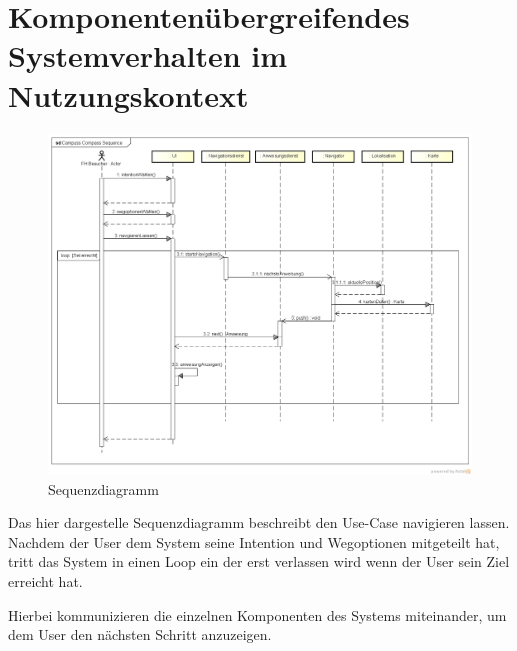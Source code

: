 \chapter{Komponentenübergreifendes Systemverhalten im Nutzungskontext}

\begin{figure}[hbt]
  \centering
   \includegraphics[width=\linewidth]{img/sequenzdiagramm.png}
  \caption{Sequenzdiagramm}
\label{fig:sequenzdiagramm}
\end{figure}

Das hier dargestelle Sequenzdiagramm beschreibt den Use-Case navigieren lassen.
Nachdem der User dem System seine Intention und Wegoptionen mitgeteilt hat,
tritt das System in einen Loop ein der erst verlassen wird wenn der User sein
Ziel erreicht hat.

\noindent Hierbei kommunizieren die einzelnen Komponenten des Systems
miteinander, um dem User den nächsten Schritt anzuzeigen.
